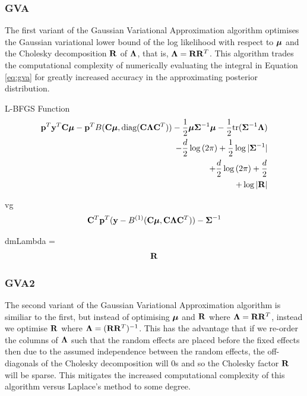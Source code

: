 \documentclass{article}[12pt]
\begin{document}

\subsubsection{GVA}
The first variant of the Gaussian Variational Approximation algorithm
optimises the Gaussian variational lower bound of the log likelihood with respect
to ${\boldsymbol \mu}$ and the Cholesky decomposition ${\bf R}$ of ${\boldsymbol \Lambda}$, that is,
${\boldsymbol \Lambda} = {\bf R} {\bf R}^T$. This algorithm trades the computational complexity of 
numerically evaluating the integral in Equation \ref{eq:gva} for greatly increased 
accuracy in the approximating posterior distribution.

L-BFGS
Function
\begin{align}\label{eq:gva}
{\bf p}^T{\bf y}^T{\bf C} {\boldsymbol \mu} - {\bf p}^T B({\bf C} {\boldsymbol \mu}, \text{diag}({\bf C} {\boldsymbol \Lambda} {\bf C}^T)) - {\frac{1}{2}} {\boldsymbol \mu} {\boldsymbol \Sigma}^{-1} {\boldsymbol \mu} - {\frac{1}{2}} \text{tr}{({\boldsymbol\Sigma}^{-1} {\boldsymbol\Lambda})} \\
- \frac{d}{2} \log{(2 \pi)} + {\frac{1}{2}} \log{|{\boldsymbol\Sigma}^{-1}|} \\
+ \frac{d}{2} \log{(2 \pi)} + \frac{d}{2} \\
+ \log{|{\bf R}|}
\end{align}

vg
\begin{align*}
{\bf C}^T {\bf p}^T({\bf y} - B^{(1)}({\bf C} {\boldsymbol \mu}, {\bf C} {\boldsymbol \Lambda} {\bf C}^T)) - {\boldsymbol \Sigma}^{-1}
\end{align*}

dmLambda =
\begin{align*}
[\mLambda&^{-1} - \vp^T \mC^T \text{diag}(B^{(2)}(\mC \vmu, \mC \mLambda \mC^T)) \mC \vp) - \mSigma^{-1}] \mR
\end{align*} 
 
\subsubsection{GVA2}
The second variant of the Gaussian Variational Approximation algorithm is similiar to
the first, but instead of optimising ${\boldsymbol \mu}$ and ${\bf R}$ where ${\boldsymbol \Lambda}={\bf R} {\bf R}^T$,
instead we optimise ${\bf R}$ where ${\boldsymbol \Lambda} = ({\bf R} {\bf R}^T)^{-1}$.
This has the advantage that if we re-order the columns of ${\boldsymbol \Lambda}$ such that
the random effects are placed before the fixed effects then due to the assumed 
independence between the random effects, the off-diagonals of the Cholesky decomposition
will 0s and so the Cholesky factor ${\bf R}$ will be sparse. This mitigates the increased
computational complexity of this algorithm versus Laplace's method to some degree.
\end{document}
